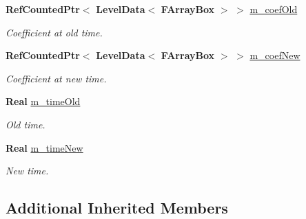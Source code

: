 \begin{DoxyCompactItemize}
\item 
\mbox{\label{class_coefficient_interpolator_linear_a4f859c7c7aa5fefe581e70b641c2c7cd}} 
\textbf{ Ref\+Counted\+Ptr}$<$ \textbf{ Level\+Data}$<$ \textbf{ F\+Array\+Box} $>$ $>$ \hyperlink{class_coefficient_interpolator_linear_a4f859c7c7aa5fefe581e70b641c2c7cd}{m\+\_\+coef\+Old}
\begin{DoxyCompactList}\small\item\em Coefficient at old time. \end{DoxyCompactList}\item 
\mbox{\label{class_coefficient_interpolator_linear_ab139ee5bd26c87a907242072d79080e2}} 
\textbf{ Ref\+Counted\+Ptr}$<$ \textbf{ Level\+Data}$<$ \textbf{ F\+Array\+Box} $>$ $>$ \hyperlink{class_coefficient_interpolator_linear_ab139ee5bd26c87a907242072d79080e2}{m\+\_\+coef\+New}
\begin{DoxyCompactList}\small\item\em Coefficient at new time. \end{DoxyCompactList}\item 
\mbox{\label{class_coefficient_interpolator_linear_a2ab6b22fe2ae4b4a67c2b2e8939a7725}} 
\textbf{ Real} \hyperlink{class_coefficient_interpolator_linear_a2ab6b22fe2ae4b4a67c2b2e8939a7725}{m\+\_\+time\+Old}
\begin{DoxyCompactList}\small\item\em Old time. \end{DoxyCompactList}\item 
\mbox{\label{class_coefficient_interpolator_linear_a6202c9344b2886cf3a951e8aed4c9dbd}} 
\textbf{ Real} \hyperlink{class_coefficient_interpolator_linear_a6202c9344b2886cf3a951e8aed4c9dbd}{m\+\_\+time\+New}
\begin{DoxyCompactList}\small\item\em New time. \end{DoxyCompactList}\end{DoxyCompactItemize}
\subsection*{Additional Inherited Members}


